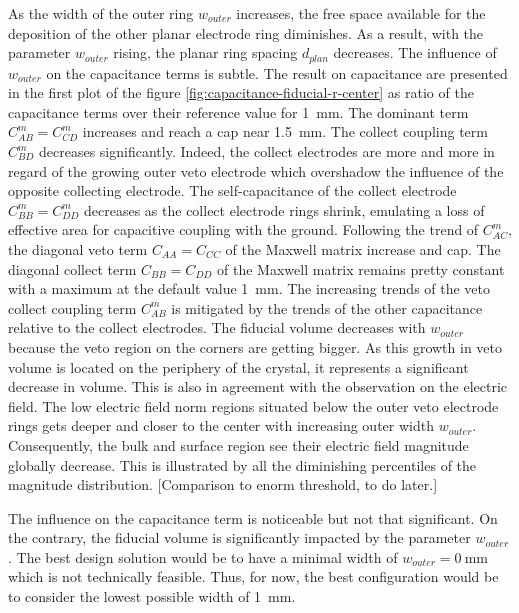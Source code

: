 As the width of the outer ring $w_{outer}$ increases, the free space available for the deposition of the other planar electrode ring diminishes. As a result, with the parameter $w_{outer}$ rising, the planar ring spacing $d_{plan}$ decreases.
The influence of $w_{outer}$ on the capacitance terms is subtle. The result on capacitance are presented in the first plot of the figure \ref{fig:capacitance-fiducial-r-center} as ratio of the capacitance terms over their reference value for \SI{1}{\mm}. The dominant term $C_{AB}^m=C_{CD}^m$ increases and reach a cap near \SI{1.5}{\mm}. The collect coupling term $C_{BD}^m$ decreases significantly.  Indeed, the collect electrodes are more and more in regard of the growing outer veto electrode which overshadow the influence of the opposite collecting electrode. The self-capacitance of the collect electrode $C_{BB}^m=C_{DD}^m$ decreases as the collect electrode rings shrink, emulating a loss of effective area for capacitive coupling with the ground. Following the trend of $C_{AC}^m$, the diagonal veto term $C_{AA} = C_{CC}$ of the Maxwell matrix increase and cap. The diagonal collect term $C_{BB} = C_{DD}$ of the Maxwell matrix remains pretty constant with a maximum at the default value \SI{1}{\mm}. The increasing trends of the veto collect coupling term $C_{AB}^m$ is mitigated by the trends of the other capacitance relative to the collect electrodes.
The fiducial volume decreases with $w_{outer}$ because the veto region on the corners are getting bigger. As this growth in veto volume is located on the periphery of the crystal, it represents a significant decrease in volume.
This is also in agreement with the observation on the electric field. The low electric field norm regions situated below the outer veto electrode rings gets deeper and closer to the center with increasing outer width $w_{outer}$. Consequently, the bulk and surface region see their electric field magnitude globally decrease. This is illustrated by all the diminishing percentiles of the magnitude distribution. {\color{red} [Comparison to enorm threshold, to do later.]}

The influence on the capacitance term is noticeable but not that significant. On the contrary, the fiducial volume is significantly impacted by the parameter $w_{outer}$. The best design solution would be to have a minimal width of $w_{outer}=\SI{0}{\mm}$ which is not technically feasible. Thus, for now, the best configuration would be to consider the lowest possible width of \SI{1}{\mm}.



